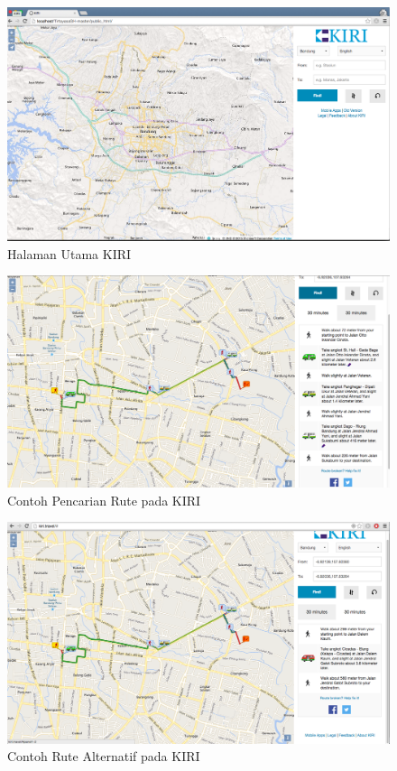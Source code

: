 \begin{figure}[H]
	\centering
	\includegraphics[scale=0.3]{Gambar/KIRI-main-5}
	\caption{Halaman Utama KIRI} 
	\label{fig:5_KIRI_main}
\end{figure}


\begin{figure}[H]
	\centering
	\includegraphics[scale=0.3]{Gambar/KIRI-find}
	\caption{Contoh Pencarian Rute pada KIRI} 
	\label{fig:5_KIRI_find}
\end{figure}

\begin{figure}[H]
	\centering
	\includegraphics[scale=0.3]{Gambar/KIRI-find-alternate}
	\caption{Contoh Rute Alternatif pada KIRI} 
	\label{fig:5_KIRI_find_alternate}
\end{figure}

